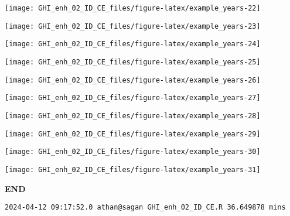 \documentclass[
  10pt,
  a4paper,oneside]{article}
\begin{document}
\begin{center}\texttt{[image: GHI\_enh\_02\_ID\_CE\_files/figure-latex/example\_years-22]} \end{center}

\begin{center}\texttt{[image: GHI\_enh\_02\_ID\_CE\_files/figure-latex/example\_years-23]} \end{center}

\begin{center}\texttt{[image: GHI\_enh\_02\_ID\_CE\_files/figure-latex/example\_years-24]} \end{center}

\begin{center}\texttt{[image: GHI\_enh\_02\_ID\_CE\_files/figure-latex/example\_years-25]} \end{center}

\begin{center}\texttt{[image: GHI\_enh\_02\_ID\_CE\_files/figure-latex/example\_years-26]} \end{center}

\begin{center}\texttt{[image: GHI\_enh\_02\_ID\_CE\_files/figure-latex/example\_years-27]} \end{center}

\begin{center}\texttt{[image: GHI\_enh\_02\_ID\_CE\_files/figure-latex/example\_years-28]} \end{center}

\begin{center}\texttt{[image: GHI\_enh\_02\_ID\_CE\_files/figure-latex/example\_years-29]} \end{center}

\begin{center}\texttt{[image: GHI\_enh\_02\_ID\_CE\_files/figure-latex/example\_years-30]} \end{center}

\begin{center}\texttt{[image: GHI\_enh\_02\_ID\_CE\_files/figure-latex/example\_years-31]} \end{center}

\textbf{END}

\begin{verbatim}
2024-04-12 09:17:52.0 athan@sagan GHI_enh_02_ID_CE.R 36.649878 mins
\end{verbatim}
\end{document}
